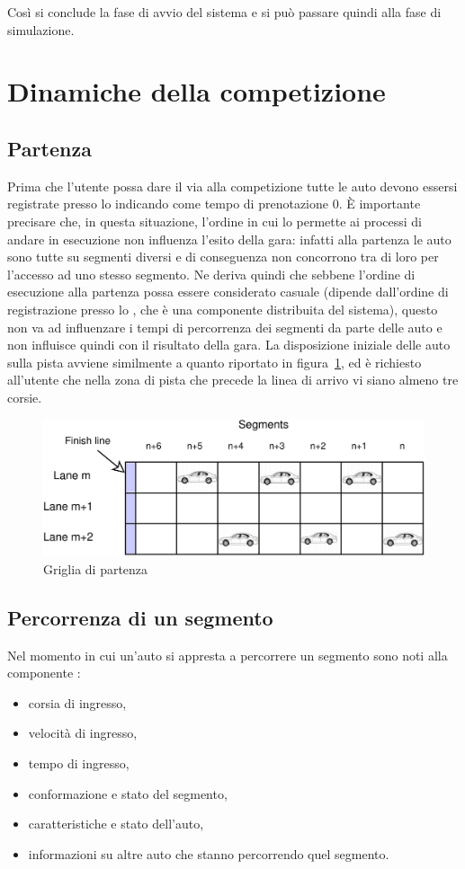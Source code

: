 Così si conclude la fase di avvio del sistema e si può passare quindi alla fase di simulazione.

\section{Dinamiche della competizione}
\subsection{Partenza}
\label{sec:partenza}
Prima che l'utente possa dare il via alla competizione tutte le auto devono essersi registrate presso lo \sched{} indicando come tempo di prenotazione $0$. \`E importante precisare che, in questa situazione, l'ordine in cui lo \sched{} permette ai processi \car{} di andare in esecuzione non influenza l'esito della gara: infatti alla partenza le auto sono tutte su segmenti diversi e di conseguenza non concorrono tra di loro per l'accesso ad uno stesso segmento. Ne deriva quindi che sebbene l'ordine di esecuzione alla partenza possa essere considerato casuale (dipende dall'ordine di registrazione presso lo \sched{}, che è una componente distribuita del sistema), questo non va ad influenzare i tempi di percorrenza dei segmenti da parte delle auto e non influisce quindi con il risultato della gara.
La disposizione iniziale delle auto sulla pista avviene similmente a quanto riportato in figura~\ref{fig:startGrid}, ed è richiesto all'utente che nella zona di pista che precede la linea di arrivo vi siano almeno tre corsie.

\begin{figure}
\includegraphics[width=\textwidth]{diagrammi/StartGrid}
\caption{Griglia di partenza}
\label{fig:startGrid}
\end{figure}

\subsection{Percorrenza di un segmento}
\label{sec:percorrenza}
Nel momento in cui un'auto si appresta a percorrere un segmento sono noti alla componente :
\begin{itemize}
\item corsia di ingresso,
\item velocità di ingresso,
\item tempo di ingresso,
\item conformazione e stato del segmento,
\item caratteristiche e stato dell'auto,
\item informazioni su altre auto che stanno percorrendo quel segmento.
\end{itemize}

